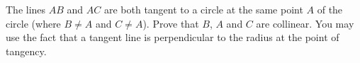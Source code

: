 The lines $AB$ and $AC$ are both tangent to a circle at the same point $A$ of the circle (where $B\ne A$ and $C\ne A$). Prove that $B$, $A$ and $C$ are collinear. You may use the fact that a tangent line is perpendicular to the radius at the point of tangency.
